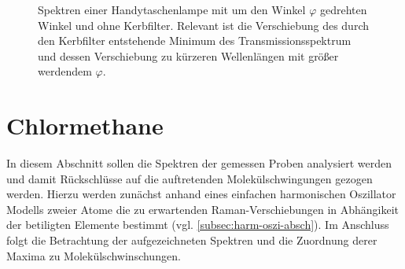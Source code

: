 \documentclass[../bericht.tex]{subfiles}
\begin{document}
        \begin{figure}[tb]
          \centering
          \caption[Spektren einer Handytaschenlampe mit um den Winkel $\varphi$ gedrehten Winkel und ohne Kerbfilter.]{Spektren einer Handytaschenlampe mit um den Winkel $\varphi$ gedrehten Winkel und ohne Kerbfilter. Relevant ist die Verschiebung des durch den Kerbfilter entstehende Minimum des Transmissionsspektrum und dessen Verschiebung zu kürzeren Wellenlängen mit größer werdendem $\varphi$.}
          \label{fig:kerbfilter-spektren}
        \end{figure}


    \section{Chlormethane}

      In diesem Abschnitt sollen die Spektren der gemessen Proben analysiert werden und damit Rückschlüsse auf die auftretenden Molekülschwingungen gezogen werden. Hierzu werden zunächst anhand eines einfachen harmonischen Oszillator Modells zweier Atome die zu erwartenden Raman-Verschiebungen in Abhängikeit der betiligten Elemente bestimmt (vgl. \cref{subsec:harm-oszi-absch}). Im Anschluss folgt die Betrachtung der aufgezeichneten Spektren und die Zuordnung derer Maxima zu Molekülschwinschungen.
\end{document}
